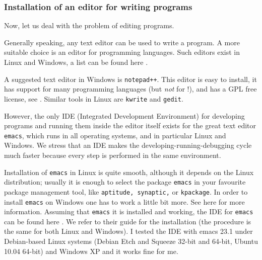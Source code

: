 \subsubsection{Installation of an editor for writing \REDUCE programs}
\label{sec:inst-reduce-ide}

Now, let us deal with the problem of editing \REDUCE programs.

Generally speaking, any text editor can be used to write a \REDUCE program. A
more suitable choice is an editor for programming languages. Such editors exist
in Linux and Windows, a list can be found here \cite{ed}.

A suggested text editor in Windows is \texttt{notepad++}. This editor is easy
to install, it has support for many programming languages (but \emph{not} for
\REDUCE!), and has a GPL free license, see \cite{noteppp}. Similar tools in
Linux are \texttt{kwrite} and \texttt{gedit}.

However, the only IDE (Integrated Development Environment) for developing
programs and running them inside the editor itself exists for the great text
editor \texttt{emacs}, which runs in all operating systems, and in particular
Linux and Windows. We stress that an IDE makes the developing-running-debugging
cycle much faster because every step is performed in the same environment.

Installation of \texttt{emacs} in Linux is quite smooth, although it depends on
the Linux distribution; usually it is enough to select the package
\texttt{emacs} in your favourite package management tool, like
\texttt{aptitude, synaptic,} or \texttt{kpackage}.  In order to install
\texttt{emacs} on Windows one has to work a little bit more. See here
\cite{emacswin} for more information.  Assuming that \texttt{emacs} it is
installed and working, the \REDUCE IDE for \texttt{emacs} can be found here
\cite{redide}.  We refer to their guide for the installation (the procedure is
the same for both Linux and Windows). I tested the IDE with emacs 23.1 under
Debian-based Linux systems (Debian Etch and Squeeze 32-bit and 64-bit, Ubuntu
10.04 64-bit) and Windows XP and it works fine for me.

